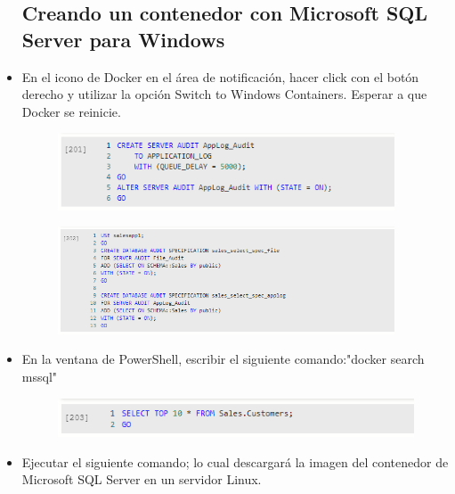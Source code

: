 \begin{itemize}
\subsection{ Creando un contenedor con Microsoft SQL Server para Windows}
	\item En el icono de Docker en el área de notificación, hacer click con el botón derecho y utilizar la opción Switch to Windows Containers. Esperar a que Docker se reinicie.
                      \begin{figure}[H]
		\begin{center}
		\includegraphics[width=10cm]{./Imagenes/s29}
		\end{center}
		\end{figure}   
                      \begin{figure}[H]
		\begin{center}
		\includegraphics[width=10cm]{./Imagenes/s30}
		\end{center}
		\end{figure}   
	\item En la ventana de PowerShell, escribir el siguiente comando:"docker search mssql"           
                       \begin{figure}[H]
		\begin{center}
		\includegraphics[width=15cm]{./Imagenes/s31}
		\end{center}
		\end{figure}   
          \item Ejecutar el siguiente comando; lo cual descargará la imagen del contenedor de Microsoft SQL Server en un servidor Linux.
		\begin{figure}[H]
		\begin{center}

\end{center}
\end{figure}
\end{itemize}
